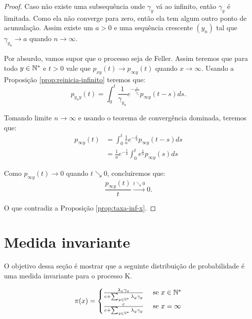 \begin{proof}
  Caso não existe uma subsequência onde $\gamma_y$ vá ao infinito,
  então $\gamma_y$ é limitada. Como ela não converge para zero, então
  ela tem algum outro ponto de acumulação. Assim existe um $a > 0$ e
  uma sequência crescente $(y_n)$ tal que $\gamma_{y_n} \to a$ quando
  $n \to \infty$.

  Por absurdo, vamos supor que o processo seja de Feller. Assim
  teremos que para todo $y \in {\mathbb{N^*}}$ e $t > 0$ vale que $p_{x y} (t)
  \to p_{\infty y} (t)$ quando $x \to \infty$. Usando a Proposição
  \ref{prop:reinicia-infinito} teremos que:
  \begin{displaymath}
    p_{y_n y}(t) = \int_0^t \frac{1}{\gamma_{y_n}}
    e^{-\frac{s}{\gamma_{y_n}}} p_{\infty y} (t-s) ds.
  \end{displaymath}
  
  Tomando limite $n \to \infty$ e usando o teorema de convergência
  dominada, teremos que:
  \begin{align*}
     p_{\infty y}(t)
     &= \int_0^t \frac{1}{a} e^{-\frac{s}{a}} p_{\infty y}(t-s) d s\\
     &= \frac{1}{a} e^{-\frac{t}{a}} \int_0^t  e^{\frac{s}{a}} p_{\infty y}(s) d s
  \end{align*}

  Como  $p_{\infty y}(t) \to 0$ quando $t \searrow 0$, concluiremos que:
  \begin{displaymath}
    \frac{p_{\infty y}(t)}{t} \xrightarrow{t \searrow 0} 0.
  \end{displaymath}

  O que contradiz a Proposição \ref{prop:taxa-inf-x}.
\end{proof}


\section{Medida invariante}
\label{sec:invariante}

O objetivo dessa seção é mostrar que a seguinte distribuição de
probabilidade é uma medida invariante para o processo K.

\begin{equation}
  \label{eq:invariante}
  \pi(x) = \begin{cases}
    \frac{\lambda_x \gamma_x}{c + \sum_{y \in {\mathbb{N^*}}} \lambda_y \gamma_y}
    & \textrm{ se } x \in {\mathbb{N^*}} \\
    \frac{c}{c + \sum_{y \in {\mathbb{N^*}}} \lambda_y \gamma_y}
    & \textrm{ se } x = \infty \\
  \end{cases}
\end{equation}

